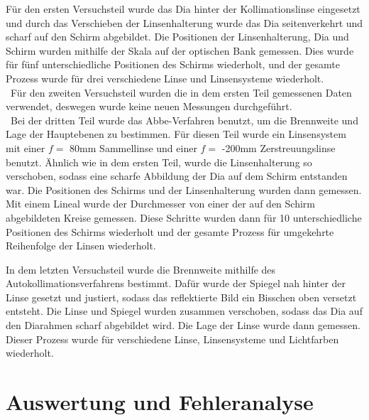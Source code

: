 \documentclass[11pt,a4paper]{article}
\begin{document}
Für den ersten Versuchsteil wurde das Dia hinter der Kollimationslinse eingesetzt und durch das Verschieben der Linsenhalterung wurde das Dia seitenverkehrt und scharf auf den Schirm abgebildet.
Die Positionen der Linsenhalterung, Dia und Schirm wurden mithilfe der Skala auf der optischen Bank gemessen. Dies wurde für fünf unterschiedliche Positionen des Schirms wiederholt, und der gesamte Prozess wurde für drei verschiedene Linse und Linsensysteme wiederholt. 
\\\
Für den zweiten Versuchsteil wurden die in dem ersten Teil gemessenen Daten verwendet, deswegen wurde keine neuen Messungen durchgeführt. 
\\\
Bei der dritten Teil wurde das Abbe-Verfahren benutzt, um die Brennweite und Lage der Hauptebenen zu bestimmen. Für diesen Teil wurde ein Linsensystem mit einer $f=$ 80mm Sammellinse und einer $f=$ -200mm Zerstreuungslinse benutzt. Ähnlich wie in dem ersten Teil, wurde die Linsenhalterung so verschoben, sodass eine scharfe Abbildung der Dia auf dem Schirm entstanden war. Die Positionen des Schirms und der Linsenhalterung wurden dann gemessen. Mit einem Lineal wurde der Durchmesser von einer der auf den Schirm abgebildeten Kreise gemessen. Diese Schritte wurden dann für 10 unterschiedliche Positionen des Schirms wiederholt und der gesamte Prozess für umgekehrte Reihenfolge der Linsen wiederholt. 

In dem letzten Versuchsteil wurde die Brennweite mithilfe des Autokollimationsverfahrens bestimmt. Dafür wurde der Spiegel nah hinter der Linse gesetzt und justiert, sodass das reflektierte Bild ein Bisschen oben versetzt entsteht. Die Linse und Spiegel wurden zusammen verschoben, sodass das Dia auf den Diarahmen scharf abgebildet wird. Die Lage der Linse wurde dann gemessen. Dieser Prozess wurde für verschiedene Linse, Linsensysteme und Lichtfarben wiederholt.

\section{Auswertung und Fehleranalyse}
\end{document}
